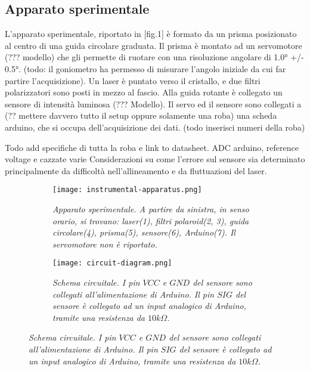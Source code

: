 \subsection{Apparato sperimentale}\label{subsec:apparato-sperimentale}
  L’apparato sperimentale, riportato in [fig.1] è formato da un prisma
  posizionato al centro di una guida circolare graduata. Il prisma è montato
  ad un servomotore (??? modello) che gli permette di ruotare con una
  risoluzione angolare di 1.0° +/- 0.5°. (todo: il goniometro ha permesso di
  misurare l’angolo iniziale da cui far partire l’acquisizione). Un laser è
  puntato verso il cristallo, e due filtri polarizzatori sono posti in mezzo
  al fascio. Alla guida rotante è collegato un sensore di intensità luminosa
  (??? Modello).
  Il servo ed il sensore sono collegati a (?? mettere davvero tutto il setup
  oppure solamente una roba) una scheda arduino, che si occupa dell’acquisizione
  dei dati.
  (todo inserisci numeri della roba)

  Todo add specifiche di tutta la roba e link to datasheet.
  ADC arduino, reference voltage e cazzate varie
  Considerazioni su come l’errore sul sensore sia determinato principalmente da difficoltà nell’allineamento e da fluttuazioni del laser.

  \begin{figure}[h]
    \centering
    \caption{Apparato sperimentale e schema circuitale.}
    \begin{subfigure}{.4\textwidth}
      \texttt{[image: instrumental-apparatus.png]}
      \caption{
        \emph{
          Apparato sperimentale. A partire da sinistra, in senso orario,
          si trovano: laser(1), filtri polaroid(2, 3), guida circolare(4),
          prisma(5), sensore(6), Arduino(7). Il servomotore non è riportato.
        }
      }
      \label{fig:instrumental-apparatus}
    \end{subfigure}%
    \hspace{20mm}
    \begin{subfigure}{.4\textwidth}
      \texttt{[image: circuit-diagram.png]}
      \caption{
        \emph{
          Schema circuitale. I pin $VCC$ e $GND$ del sensore sono collegati
          all'alimentazione di Arduino. Il pin $SIG$
          del sensore è collegato ad un input analogico di Arduino, tramite una
          resistenza da $10k\Omega$.
        }
      }
      \label{fig:circuit-diagram}
    \end{subfigure}
  \end{figure}

